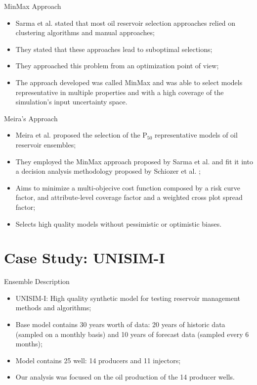 \documentclass{beamer}
\begin{document}
\begin{frame}{MinMax Approach}
  \begin{itemize}
    \item Sarma et al.  stated that most oil reservoir selection approaches relied on clustering algorithms and manual approaches;
    \item They stated that these approaches lead to suboptimal selections;
    \item They approached this problem from an optimization point of view;
    \item The approach developed was called MinMax and was able to select models representative in multiple properties and with a high coverage of the simulation's input uncertainty space.
  \end{itemize}
\end{frame}

\begin{frame}{Meira's Approach}
  \begin{itemize}
    \item Meira et al.  proposed the selection of the P$_{50}$ representative models of oil reservoir ensembles;
    \item They employed the MinMax approach proposed by Sarma et al. and fit it into a decision analysis methodology proposed by Schiozer et al. ;
    \item Aims to minimize a multi-objecive cost function composed by a risk curve factor, and attribute-level coverage factor and a weighted cross plot spread factor;
    \item Selects high quality models without pessimistic or optimistic biases.
  \end{itemize}
\end{frame}

\section{Case Study: UNISIM-I}
\begin{frame}
  \tableofcontents[currentsection]
\end{frame}

\begin{frame}{Ensemble Description}
  \begin{itemize}
    \item UNISIM-I: High quality synthetic model for testing reservoir management methods and algorithms;
    \item Base model contains 30 years worth of data: 20 years of historic data (sampled on a monthly basis) and 10 years of forecast data (sampled every 6 months);
    \item Model contains 25 well: 14 producers and 11 injectors;
    \item Our analysis was focused on the oil production of the 14 producer wells.
  \end{itemize}
\end{frame}
\end{document}
